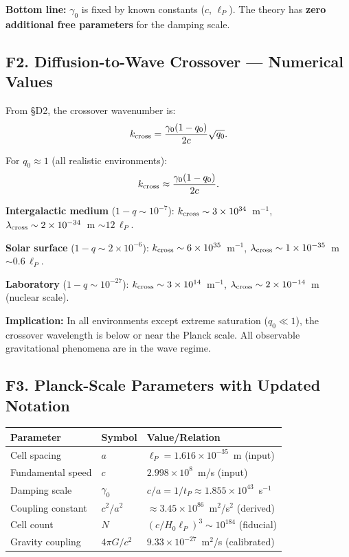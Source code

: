 \documentclass[reprint]{revtex4-2}
\begin{document}
\textbf{Bottom line:} $\gamma_0$ is fixed by known constants ($c$, $\ell_P$). The theory has \textbf{zero additional free parameters} for the damping scale.

\subsection{F2. Diffusion-to-Wave Crossover --- Numerical Values}

From \S D2, the crossover wavenumber is:
\begin{equation}
k_{\rm cross} = \frac{\gamma_0(1-q_0)}{2c}\sqrt{q_0}.
\end{equation}

For $q_0 \approx 1$ (all realistic environments):
\begin{equation}
k_{\rm cross} \approx \frac{\gamma_0(1-q_0)}{2c}.
\end{equation}

\textbf{Intergalactic medium} ($1-q \sim 10^{-7}$): $k_{\rm cross} \sim 3\times 10^{34}$~m$^{-1}$, $\lambda_{\rm cross} \sim 2\times 10^{-34}$~m $\sim 12\,\ell_P$.

\textbf{Solar surface} ($1-q \sim 2\times 10^{-6}$): $k_{\rm cross} \sim 6\times 10^{35}$~m$^{-1}$, $\lambda_{\rm cross} \sim 1\times 10^{-35}$~m $\sim 0.6\,\ell_P$.

\textbf{Laboratory} ($1-q \sim 10^{-27}$): $k_{\rm cross} \sim 3\times 10^{14}$~m$^{-1}$, $\lambda_{\rm cross} \sim 2\times 10^{-14}$~m (nuclear scale).

\textbf{Implication:} In all environments except extreme saturation ($q_0 \ll 1$), the crossover wavelength is below or near the Planck scale. All observable gravitational phenomena are in the wave regime.

\subsection{F3. Planck-Scale Parameters with Updated Notation}

\begin{center}
\begin{tabular}{lll}
\toprule
Parameter & Symbol & Value/Relation \\
\midrule
Cell spacing & $a$ & $\ell_P = 1.616\times 10^{-35}$~m (input) \\
Fundamental speed & $c$ & $2.998\times 10^8$~m/s (input) \\
Damping scale & $\gamma_0$ & $c/a = 1/t_P \approx 1.855\times 10^{43}$~s$^{-1}$ \\
Coupling constant & $c^2/a^2$ & $\approx 3.45\times 10^{86}$~m$^2$/s$^2$ (derived) \\
Cell count & $N$ & $(c/H_0\ell_P)^3 \sim 10^{184}$ (fiducial) \\
Gravity coupling & $4\pi G/c^2$ & $9.33\times 10^{-27}$~m$^2$/s (calibrated) \\
\bottomrule
\end{tabular}
\end{center}
\end{document}
